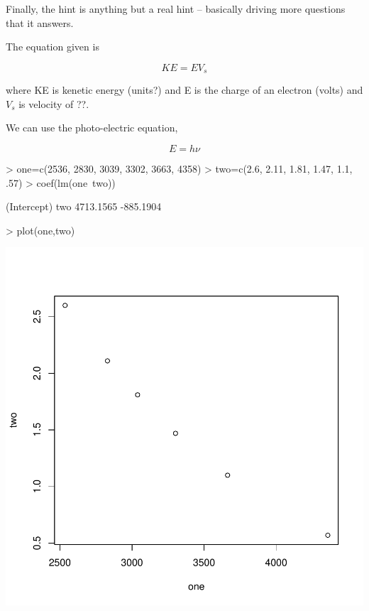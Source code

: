 \documentclass{article}
\begin{document}
Finally, the hint is anything but a real hint -- basically driving more questions that it answers. 

The equation given is 

\begin{equation}
KE = EV_s
\end{equation}

\noindent where KE is kenetic energy (units?) and E is the charge of an electron (volts) and $V_s$ is velocity of ??.


We can use the photo-electric equation,

\begin{equation}
E = h\nu
\end{equation}

\begin{Schunk}
\begin{Sinput}
> one=c(2536, 2830, 3039, 3302, 3663, 4358)
> two=c(2.6, 2.11, 1.81, 1.47, 1.1, .57)
> coef(lm(one~two))
\end{Sinput}
\begin{Soutput}
(Intercept)         two 
  4713.1565   -885.1904 
\end{Soutput}
\begin{Sinput}
> plot(one,two)
\end{Sinput}
\end{Schunk}
\includegraphics{Chemistry1-002}
\end{document}
